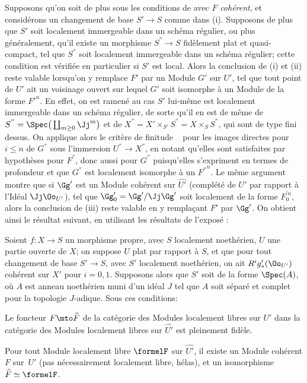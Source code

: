 \begin{remarque} \label{XII.5.9}
Supposons qu'on soit de plus sous les conditions de  avec $F$ \emph{coh\'erent}, et consid\'erons un changement de base $S'\to S$ comme dans  (i). Supposons de plus que $S'$ soit localement immergeable dans un sch\'ema r\'egulier, ou plus g\'en\'eralement, qu'il existe un morphisme $S^{''}\to S$ fid\`element plat et quasi-compact, tel que $S^{''}$ soit localement immergeable dans un sch\'ema r\'egulier; cette condition est v\'erifi\'ee en particulier si $S'$ est local. Alors la conclusion de  (i) et (ii) reste valable lorsqu'on y remplace $F'$ par un Module $G'$ sur $U'$, tel que tout point de $U'$ ait un voisinage ouvert sur lequel $G'$ soit isomorphe \`a un Module de la forme ${F'}^n$. En effet, on est ramen\'e au cas $S'$ lui-m\^eme est localement immergeable dans un sch\'ema r\'egulier, de sorte qu'il en est de m\^eme de $S^{''}=\Spec\big(\coprod_{m\geq 0}\Jj^m\big)$ et de $X^{''}=X'\times_{S'} S^{''}= X\times_{S} S^{''}$, qui sont de type fini dessus. On applique alors le crit\`ere de finitude ~ pour les images directes pour $i\leq n$ de $G^{''}$ sous l'immersion $U^{''}\to X^{''}$, en notant qu'elles sont satisfaites par hypoth\`eses pour $F^{''}$\pageoriginaled, donc aussi pour $G^{''}$ puisqu'elles s'expriment en termes de profondeur et que $G^{''}$ est localement isomorphe \`a un ${F^{''}}^n$. Le m\^eme argument montre que si $\Gg'$ est un Module coh\'erent sur $\widehat{U'}$ (compl\'et\'e de $U'$ par rapport \`a l'Id\'eal $\Jj\Oo_{U'}$), tel que $\Gg'_0=\Gg'/\Jj\Gg'$ soit localement de la forme $F_0^{'n}$, alors la conclusion de (iii) reste valable en y rempla\c cant $F'$ par $\Gg'$. On obtient ainsi le r\'esultat suivant, en utilisant les r\'esultats de l'expos\'e :
\end{remarque}

\begin{corollaire} \label{XII.5.10}
Soient $f:X\to S$ un morphisme propre, avec $S$ localement noeth\'erien, $U$ une partie ouverte de $X$; on suppose $U$ plat par rapport \`a $S$, et que pour tout changement de base $S'\to S$, avec $S'$ localement noeth\'erien, on ait $R^ig'_\ast(\Oo_{U'})$ coh\'erent sur $X'$ pour $i=0, 1$. Supposons alors que $S'$ soit de la forme $\Spec(A)$, o\`u $A$ est anneau noeth\'erien muni d'un id\'eal $J$ tel que $A$ soit s\'epar\'e et complet pour la topologie $J$-adique. Sous ces conditions:
\begin{enumeratei}
\item
Le foncteur $F\mto\widehat{F}$ de la cat\'egorie des Modules localement libres sur $U'$ dans la cat\'egorie des Modules localement libres sur $\widehat{U'}$ est pleinement fid\`ele.
\item
Pour tout Module localement libre $\formelF$ sur $\widehat{U'}$, il existe un Module coh\'erent $F$ sur~$U'$ (pas n\'ecessairement localement libre, h\'elas), et un isomorphisme $\widehat{F}\simeq \formelF$.
\end{enumeratei}
\end{corollaire}

